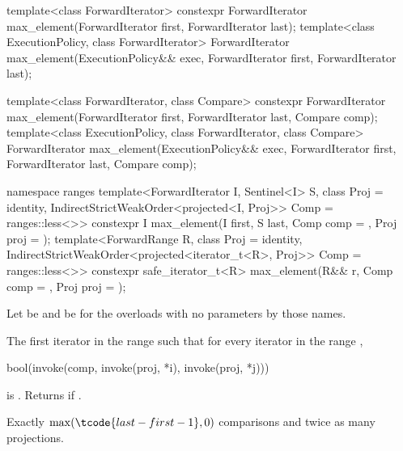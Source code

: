%
\begin{itemdecl}
template<class ForwardIterator>
  constexpr ForwardIterator max_element(ForwardIterator first, ForwardIterator last);
template<class ExecutionPolicy, class ForwardIterator>
  ForwardIterator max_element(ExecutionPolicy&& exec,
                              ForwardIterator first, ForwardIterator last);

template<class ForwardIterator, class Compare>
  constexpr ForwardIterator max_element(ForwardIterator first, ForwardIterator last,
                                        Compare comp);
template<class ExecutionPolicy, class ForwardIterator, class Compare>
  ForwardIterator max_element(ExecutionPolicy&& exec,
                              ForwardIterator first, ForwardIterator last,
                              Compare comp);

namespace ranges {
  template<ForwardIterator I, Sentinel<I> S, class Proj = identity,
           IndirectStrictWeakOrder<projected<I, Proj>> Comp = ranges::less<>>
    constexpr I max_element(I first, S last, Comp comp = {}, Proj proj = {});
  template<ForwardRange R, class Proj = identity,
           IndirectStrictWeakOrder<projected<iterator_t<R>, Proj>> Comp = ranges::less<>>
    constexpr safe_iterator_t<R>
      max_element(R&& r, Comp comp = {}, Proj proj = {});
}
\end{itemdecl}

\begin{itemdescr}
\pnum
Let  be 
and  be 
for the overloads with no parameters by those names.

\pnum
\returns
The first iterator  in the range 
such that for every iterator  in the range ,
\begin{codeblock}
bool(invoke(comp, invoke(proj, *i), invoke(proj, *j)))
\end{codeblock}
is .
Returns  if .

\pnum
\complexity
Exactly $\max(\tcode{last - first - 1}, 0)$ comparisons and
twice as many projections.
\end{itemdescr}

